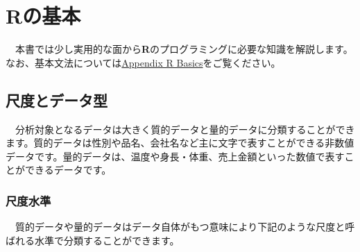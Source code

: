 \documentclass[
  12pt,
]{book}
\begin{document}
\hypertarget{rux306eux57faux672c}{%
\chapter{Rの基本}\label{rux306eux57faux672c}}

　本書では少し実用的な面から\textbf{R}のプログラミングに必要な知識を解説します。なお、基本文法については\protect\hyperlink{Appendix-RBasics}{Appendix R Basics}をご覧ください。

\hypertarget{ux5c3aux5ea6ux3068ux30c7ux30fcux30bfux578b}{%
\section{尺度とデータ型}\label{ux5c3aux5ea6ux3068ux30c7ux30fcux30bfux578b}}

　分析対象となるデータは大きく質的データと量的データに分類することができます。質的データは性別や品名、会社名など主に文字で表すことができる非数値データです。量的データは、温度や身長・体重、売上金額といった数値で表すことができるデータです。

\hypertarget{ux5c3aux5ea6ux6c34ux6e96}{%
\subsection{尺度水準}\label{ux5c3aux5ea6ux6c34ux6e96}}

　質的データや量的データはデータ自体がもつ意味により下記のような尺度と呼ばれる水準で分類することができます。
\end{document}
